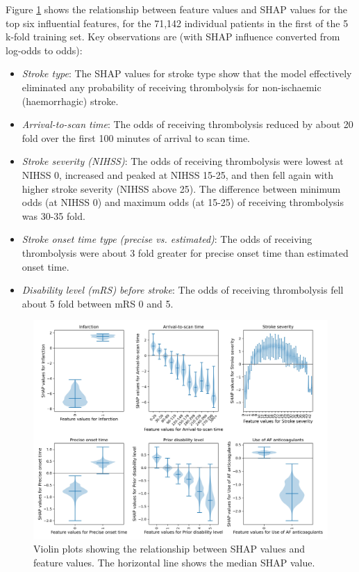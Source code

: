 \iffalse
Figure \ref{fig:results_shap_violin} shows the relationship between feature values and SHAP values for the top six influential features, for the 71,142 individual patients in the first of the 5 k-fold training set. Key observations are (with SHAP influence converted from log-odds to odds):

\begin{itemize}
    \item \emph{Stroke type}: The SHAP values for stroke type show that the model effectively eliminated any probability of receiving thrombolysis for non-ischaemic (haemorrhagic) stroke.
    \item \emph{Arrival-to-scan time}: The odds of receiving thrombolysis reduced by about 20 fold over the first 100 minutes of arrival to scan time.
    \item \emph{Stroke severity (NIHSS)}: The odds of receiving thrombolysis were lowest at NIHSS 0, increased and peaked at NIHSS 15-25, and then fell again with higher stroke severity (NIHSS above 25). The difference between minimum odds (at NIHSS 0) and maximum odds (at 15-25) of receiving thrombolysis was 30-35 fold.
    \item \emph{Stroke onset time type (precise vs. estimated)}: The odds of receiving thrombolysis were about 3 fold greater for precise onset time than estimated onset time.
    \item \emph{Disability level (mRS) before stroke}: The odds of receiving thrombolysis fell about 5 fold between mRS 0 and 5.
\end{itemize}

\begin{figure}[!h]
\centering
\includegraphics[width=1\textwidth]{./images/03_xgb_10_features_thrombolysis_shap_violin}
\caption{Violin plots showing the relationship between SHAP values and feature values. The horizontal line shows the median SHAP value.}
\label{fig:results_shap_violin}
\end{figure}

